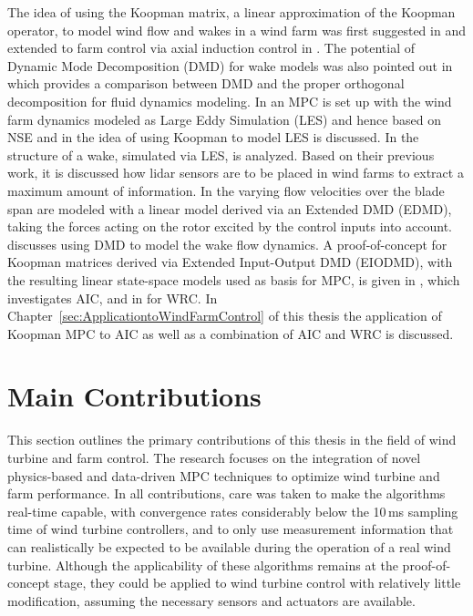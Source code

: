 The idea of using the Koopman matrix, a linear approximation of the Koopman operator, to model wind flow and wakes in a wind farm was first suggested in \cite{annoni2016wind} and extended to farm control via axial induction control in \cite{annoni2016sparsity}. The potential of Dynamic Mode Decomposition (DMD) for wake models was also pointed out in \cite{proctor2016including} which provides a comparison between DMD and the proper orthogonal decomposition for fluid dynamics modeling. In \cite{munters2017optimal} an MPC is set up with the wind farm dynamics modeled as Large Eddy Simulation (LES) and hence based on NSE and in \cite{munters2018data} the idea of using Koopman to model LES is discussed. In \cite{debnath2017towards} the structure of a wake, simulated via LES, is analyzed. Based on their previous work, it is discussed \cite{annoni2018sparse} how lidar sensors are to be placed in wind farms to extract a maximum amount of information. In \cite{ali2020data} the varying flow velocities over the blade span are modeled with a linear model derived via an Extended DMD (EDMD), taking the forces acting on the rotor excited by the control inputs into account. \cite{chen2020data} discusses using DMD to model the wake flow dynamics. A proof-of-concept for Koopman matrices derived via  Extended Input-Output DMD (EIODMD), with the resulting linear state-space models used as basis for MPC, is given in \cite{Cassamo.2020}, which investigates AIC, and in \cite{cassamo2021model} for WRC. In Chapter~\ref{sec:ApplicationtoWindFarmControl} of this thesis the application of Koopman MPC to AIC as well as a combination of AIC and WRC is discussed. 

\section{Main Contributions}
This section outlines the primary contributions of this thesis in the field of wind turbine and farm control. The research focuses on the integration of novel physics-based and data-driven MPC techniques to optimize wind turbine and farm performance. In all contributions, care was taken to make the algorithms real-time capable, with convergence rates considerably below the 10\,ms sampling time of wind turbine controllers, and to only use measurement information that can realistically be expected to be available during the operation of a real wind turbine. Although the applicability of these algorithms remains at the proof-of-concept stage, they could be applied to wind turbine control with relatively little modification, assuming the necessary sensors and actuators are available. 

